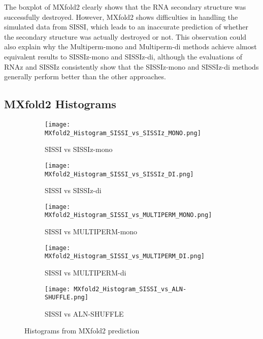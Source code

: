 \documentclass{article}
\begin{document}
\begin{large}
\begin{large}
\begin{large}
The boxplot of MXfold2 clearly shows that the RNA secondary structure was successfully destroyed. However, MXfold2 shows difficulties in handling the simulated data from SISSI, which leads to an inaccurate prediction of whether the secondary structure was actually destroyed or not. This observation could also explain why the Multiperm-mono and Multiperm-di methods achieve almost equivalent results to SISSIz-mono and SISSIz-di, although the evaluations of RNAz and SISSIz consistently show that the SISSIz-mono and SISSIz-di methods generally perform better than the other approaches.

\subsection{MXfold2 Histograms}

\begin{figure}[H]
    \centering
    \begin{subfigure}[b]{0.48\textwidth}
        \texttt{[image: MXfold2\_Histogram\_SISSI\_vs\_SISSIz\_MONO.png]}
        \caption{SISSI vs SISSIz-mono}
    \end{subfigure}
    \hfill
    \begin{subfigure}[b]{0.48\textwidth}
        \texttt{[image: MXfold2\_Histogram\_SISSI\_vs\_SISSIz\_DI.png]}
        \caption{SISSI vs SISSIz-di}
    \end{subfigure}
    \vspace{1em}
    
    \begin{subfigure}[b]{0.48\textwidth}
        \texttt{[image: MXfold2\_Histogram\_SISSI\_vs\_MULTIPERM\_MONO.png]}
        \caption{SISSI vs MULTIPERM-mono}
    \end{subfigure}
    \hfill
    \begin{subfigure}[b]{0.48\textwidth}
        \texttt{[image: MXfold2\_Histogram\_SISSI\_vs\_MULTIPERM\_DI.png]}
        \caption{SISSI vs MULTIPERM-di}
    \end{subfigure}
    \vspace{1em}
    
    \begin{subfigure}[b]{0.48\textwidth}
        \texttt{[image: MXfold2\_Histogram\_SISSI\_vs\_ALN-SHUFFLE.png]}
        \caption{SISSI vs ALN-SHUFFLE}
    \end{subfigure}

    \caption{Histograms from MXfold2 prediction}
\end{figure}


\end{large}
\end{large}
\end{large}
\end{document}

